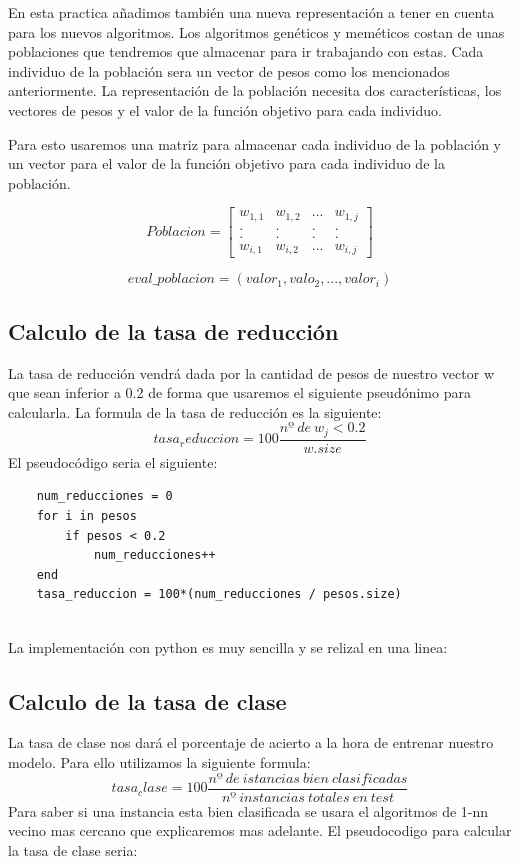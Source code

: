 \documentclass[titlepage]{article}
\begin{document}
	En esta practica añadimos también una nueva representación a tener en cuenta para los nuevos algoritmos. Los algoritmos genéticos y meméticos costan de unas poblaciones que tendremos que almacenar para ir trabajando con estas. Cada individuo de la población sera un vector de pesos como los mencionados anteriormente. La representación de la población necesita dos características, los vectores de pesos y el valor de la función objetivo para cada individuo.
	
	Para esto usaremos una matriz para almacenar cada individuo de la población y un vector para el valor de la función objetivo para cada individuo de la población.
	
	\[
	Poblacion =
	\begin{bmatrix}
	w_{1,1} & w_{1,2} & ... & w_{1,j} \\
	. & . & . & . \\
	. & . & . & .\\
	w_{i,1} & w_{i,2} & ... & w_{i,j}
	\end{bmatrix}
	\]
	
	$$
	eval\_poblacion = (valor_1, valo_2, ..., valor_i)
	$$
	\newline
	
	
	

	
	

	
	
	\subsection{Calculo de la tasa de reducción}
	La tasa de reducción vendrá dada por la cantidad de pesos de nuestro vector w que sean inferior a 0.2 de forma que usaremos el siguiente pseudónimo para calcularla.
	La formula de la tasa de reducción es la siguiente:
	$$
		tasa_reduccion = 100 \frac{nº\ de\ w_j < 0.2}{w.size}
	$$
	El pseudocódigo seria el siguiente:
	\begin{lstlisting}
	num_reducciones = 0
	for i in pesos
		if pesos < 0.2
			num_reducciones++
	end
	tasa_reduccion = 100*(num_reducciones / pesos.size)
	
	\end{lstlisting}
	
	La implementación con python es muy sencilla y se relizal en una linea: 
	
	\subsection{Calculo de la tasa de clase}
	La tasa de clase nos dará el porcentaje de acierto a la hora de entrenar nuestro modelo. Para ello utilizamos la siguiente formula:
	$$
	tasa_clase = 100 \frac{nº\ de\ istancias\ bien\ clasificadas}{nº\ instancias\ totales\ en\ test}
	$$
	Para saber si una instancia esta bien clasificada se usara el algoritmos de 1-nn vecino mas cercano que explicaremos mas adelante.
	El pseudocodigo para calcular la tasa de clase seria:
	
\end{document}
